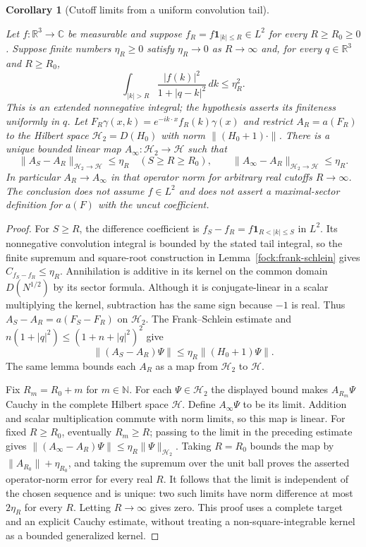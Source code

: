 \documentclass[11pt,a4paper]{article}
\newtheorem{corollary}[theorem]{Corollary}
\theoremstyle{definition}
\theoremstyle{remark}
\newcommand{\proofid}[1]{\par\smallskip{\normalfont\scriptsize\color{inkblue}Stable ID: \nolinkurl{#1}}\par\smallskip}
\begin{document}
\begin{corollary}[Cutoff limits from a uniform convolution tail]
\label{fock:convolution-use}
\proofid{fock:convolution-use}
\par{}\par\smallskip

Let $f:\mathbb R^3\to\mathbb C$ be measurable and suppose
$f_R=f\mathbf1_{|k|\leq R}\in L^2$ for every $R\geq R_0\geq0$.
Suppose finite numbers $\eta_R\geq0$ satisfy $\eta_R\to0$ as
$R\to\infty$ and, for every $q\in\mathbb R^3$ and $R\geq R_0$,
\[
 \int_{|k|>R}\frac{|f(k)|^2}{1+|q-k|^2}\,dk\leq\eta_R^2.
\]
This is an extended nonnegative integral; the hypothesis asserts
its finiteness uniformly in $q$. Let
$F_R\gamma(x,k)=e^{-ik\cdot x}f_R(k)\gamma(x)$ and restrict
$A_R=a(F_R)$ to the Hilbert space
$\mathcal H_2=D(H_0)$ with norm $\|(H_0+1)\cdot\|$.
There is a unique bounded linear map
$A_\infty:\mathcal H_2\to\mathcal H$ such that
\[
 \|A_S-A_R\|_{\mathcal H_2\to\mathcal H}\leq\eta_R
   \quad(S\geq R\geq R_0),\qquad
 \|A_\infty-A_R\|_{\mathcal H_2\to\mathcal H}\leq\eta_R.
\]
In particular $A_R\to A_\infty$ in that operator norm for arbitrary
real cutoffs $R\to\infty$. The conclusion does not assume $f\in L^2$
and does not assert a maximal-sector definition for $a(F)$ with
the uncut coefficient.
\end{corollary}
\begin{proof}
For $S\geq R$, the difference coefficient is
$f_S-f_R=f\mathbf1_{R<|k|\leq S}$ in $L^2$.
Its nonnegative convolution integral is bounded by the stated
tail integral, so the finite supremum and square-root construction
in Lemma~\ref{fock:frank-schlein} gives $C_{f_S-f_R}\leq\eta_R$.
Annihilation is additive in its kernel on the common domain
$D(N^{1/2})$ by its sector formula. Although it is conjugate-linear
in a scalar multiplying the kernel, subtraction has the same sign
because $-1$ is real. Thus $A_S-A_R=a(F_S-F_R)$ on $\mathcal H_2$.
The Frank--Schlein estimate and
$n(1+|q|^2)\leq(1+n+|q|^2)^2$ give
\[
 \|(A_S-A_R)\Psi\|\leq\eta_R\|(H_0+1)\Psi\|.
\]
The same lemma bounds each $A_R$ as a map from $\mathcal H_2$
to $\mathcal H$.

Fix $R_m=R_0+m$ for $m\in\mathbb N$. For each
$\Psi\in\mathcal H_2$ the displayed bound
makes $A_{R_m}\Psi$ Cauchy in the complete Hilbert space
$\mathcal H$. Define $A_\infty\Psi$ to be its limit. Addition
and scalar multiplication commute with norm limits, so this map
is linear. For fixed $R\geq R_0$, eventually $R_m\geq R$;
passing to the limit in the preceding estimate gives
$\|(A_\infty-A_R)\Psi\|\leq\eta_R\|\Psi\|_{\mathcal H_2}$.
Taking $R=R_0$ bounds the map by $\|A_{R_0}\|+\eta_{R_0}$,
and taking the supremum over the unit ball proves the asserted
operator-norm error for every real $R$. It follows that the limit
is independent of the chosen sequence and is unique: two such
limits have norm difference at most $2\eta_R$ for every $R$.
Letting $R\to\infty$ gives zero. This proof uses a complete
target and an explicit Cauchy estimate, without treating a
non-square-integrable kernel as a bounded generalized kernel.
\end{proof}
\end{document}
